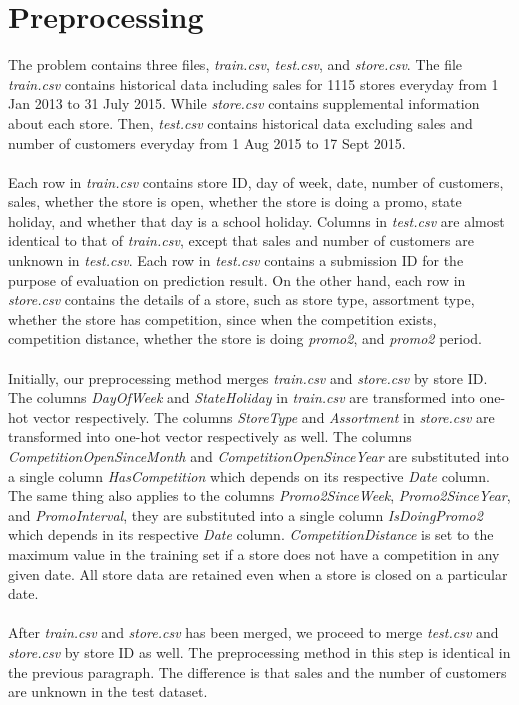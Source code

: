 \chapter{Preprocessing} \label{ch:preprocessing}
The problem contains three files, \textit{train.csv}, \textit{test.csv}, and \textit{store.csv}. The file \textit{train.csv} contains historical data including sales for 1115 stores everyday from 1 Jan 2013 to 31 July 2015. While \textit{store.csv} contains supplemental information about each store. Then, \textit{test.csv} contains historical data excluding sales and number of customers everyday from 1 Aug 2015 to 17 Sept 2015. \\ \\
Each row in \textit{train.csv} contains store ID, day of week, date, number of customers, sales, whether the store is open, whether the store is doing a promo, state holiday, and whether that day is a school holiday. Columns in \textit{test.csv} are almost identical to that of \textit{train.csv}, except that sales and number of customers are unknown in \textit{test.csv}. Each row in \textit{test.csv} contains a submission ID for the purpose of evaluation on prediction result. On the other hand, each row in \textit{store.csv} contains the details of a store, such as store type, assortment type, whether the store has competition, since when the competition exists, competition distance, whether the store is doing \textit{promo2}, and \textit{promo2} period. \\ \\
Initially, our preprocessing method merges \textit{train.csv} and \textit{store.csv} by store ID. The columns \textit{DayOfWeek} and \textit{StateHoliday} in \textit{train.csv}  are transformed into one-hot vector respectively. The columns \textit{StoreType} and \textit{Assortment} in \textit{store.csv} are transformed into one-hot vector respectively as well. The columns \textit{CompetitionOpenSinceMonth} and \textit{CompetitionOpenSinceYear} are substituted into a single column \textit{HasCompetition} which depends on its respective \textit{Date} column. The same thing also applies to the columns \textit{Promo2SinceWeek}, \textit{Promo2SinceYear}, and \textit{PromoInterval}, they are substituted into a single column \textit{IsDoingPromo2} which depends in its respective \textit{Date} column. \textit{CompetitionDistance} is set to the maximum value in the training set if a store does not have a competition in any given date. All store data are retained even when a store is closed on a particular date. \\ \\
After \textit{train.csv} and \textit{store.csv} has been merged, we proceed to merge \textit{test.csv} and \textit{store.csv} by store ID as well. The preprocessing method in this step is identical in the previous paragraph. The difference is that sales and the number of customers are unknown in the test dataset.